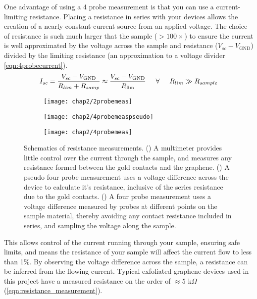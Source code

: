 \documentclass[../../Matt_Gebert_Honours_Thesis.tex]{subfiles}
\begin{document}
	One advantage of using a 4 probe measurement is that you can use a current-limiting resistance. Placing a resistance in series with your devices allows the creation of a nearly constant-current source from an applied voltage. The choice of resistance is such much larger that the sample ($>100\times$) to ensure the current is well approximated by the voltage across the sample and resistance ($V_{sc} - V_{\text{GND}}$) divided by the limiting resistance (an approximation to a voltage divider \cref{eqn:4probecurrent}).
	\begin{align}
		I_{sc} = \frac{V_{sc}-V_{\text{GND}}}{R_{lim} + R_{samp}} \approx \frac{V_{sc}-V_{\text{GND}}}{R_{\lim}} \hspace{0.5cm} \forall \hspace{0.5cm} R_{lim} \gg R_{sample}\label{eqn:4probecurrent}
	\end{align}
	\begin{figure}[H]
		\centering
		\begin{subfigure}[t]{0.25\textwidth}
			\centering
			\texttt{[image: chap2/2probemeas]}
			\caption{}\label{subfig:mutlimeter}
		\end{subfigure}\qquad
		\begin{subfigure}[t]{0.235\textwidth}
			\centering
			\texttt{[image: chap2/4probemeaspseudo]}
			\caption{}\label{subfig:4probepseudo}
		\end{subfigure}\qquad
		\begin{subfigure}[t]{0.25\textwidth}
			\centering
			\texttt{[image: chap2/4probemeas]}
			\caption{}\label{subfig:4probe}
		\end{subfigure}
		\caption[Schematics of resistance measurements]{Schematics of resistance measurements. () A multimeter provides little control over the current through the sample, and measures any resistance formed between the gold contacts and the graphene. () A pseudo four probe measurement uses a voltage difference across the device to calculate it's resistance, inclusive of the series resistance due to the gold contacts. () A four probe measurement uses a voltage difference measured by probes at different points on the sample material, thereby avoiding any contact resistance included in series, and sampling the voltage along the sample.}
		\label{fig:4probemeasurements}
	\end{figure}
	This allows control of the current running through your sample, ensuring safe limits, and means the resistance of your sample will affect the current flow to less than 1\%. By observing the voltage difference across the sample, a resistance can be inferred from the flowing current. Typical exfoliated graphene devices used in this project have a measured resistance on the order of $\approx$5 k$\Omega$ (\cref{eqn:resistance_measurement}).
	
\end{document}
